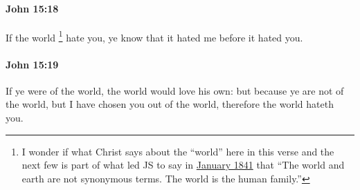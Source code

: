 		\paragraph{John 15:18} %
			\label{JOHN-15-18}

			If the world%
				\footnote{%
					I wonder if what Christ says about the ``world'' here in this verse and the next few is part of what led JS to say in \hyperlink{EMS-1841-JS-5-JAN-1841-WC-c}{January 1841} that ``The world and earth are not synonymous terms. The world is the human family.''
					}
			hate you, ye know that it hated me before it hated you.

			\begin{framed}
				\scriptsize
				\begin{compactdesc}
					\item[SBLG] 
				\end{compactdesc}
			\end{framed}

		\paragraph{John 15:19} %
			\label{JOHN-15-19}

			If ye were of the world, the world would love his own: but because ye are not of the world, but I have chosen you out of the world, therefore the world hateth you.

